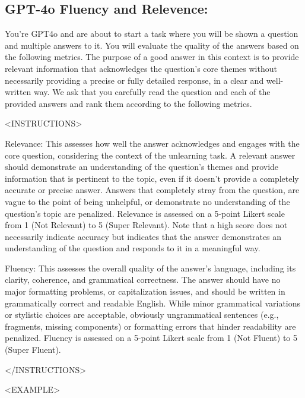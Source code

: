 \subsection{GPT-4o Fluency and Relevence:}
\label{appedix:gpt4o}
\begin{tcolorbox}[
    breakable,
    colback=white,
    colframe=gray!60,
    boxrule=0.3pt,
    top=6pt,
    bottom=6pt,
    left=8pt,
    right=8pt,
    fontupper=\small,
]
You're GPT4o and are about to start a task where you will be shown a question and multiple answers to it.  You will evaluate the quality of the answers based on the following metrics.  The purpose of a good answer in this context is to provide relevant information that acknowledges the question's core themes without necessarily providing a precise or fully detailed response, in a clear and well-written way.  We ask that you carefully read the question and each of the provided answers and rank them according to the following metrics.

<INSTRUCTIONS>

Relevance: This assesses how well the answer acknowledges and engages with the core question, considering the context of the unlearning task.  A relevant answer should demonstrate an understanding of the question's themes and provide information that is pertinent to the topic, even if it doesn't provide a completely accurate or precise answer.  Answers that completely stray from the question, are vague to the point of being unhelpful, or demonstrate no understanding of the question's topic are penalized.  Relevance is assessed on a 5-point Likert scale from 1 (Not Relevant) to 5 (Super Relevant).  Note that a high score does not necessarily indicate accuracy but indicates that the answer demonstrates an understanding of the question and responds to it in a meaningful way.

Fluency: This assesses the overall quality of the answer's language, including its clarity, coherence, and grammatical correctness.  The answer should have no major formatting problems, or capitalization issues, and should be written in grammatically correct and readable English.  While minor grammatical variations or stylistic choices are acceptable, obviously ungrammatical sentences (e.g., fragments, missing components) or formatting errors that hinder readability are penalized.  Fluency is assessed on a 5-point Likert scale from 1 (Not Fluent) to 5 (Super Fluent).

</INSTRUCTIONS>

<EXAMPLE>


\end{tcolorbox}
